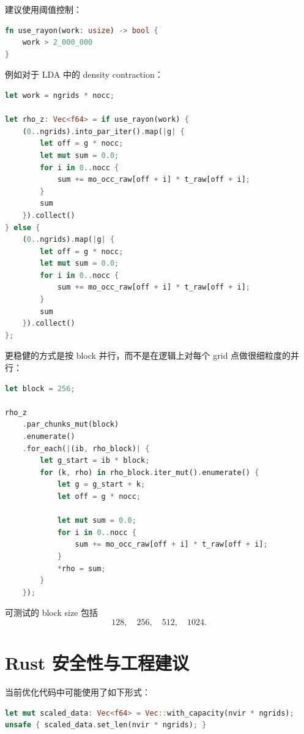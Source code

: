 \documentclass[11pt,a4paper]{ctexart}
\begin{document}
建议使用阈值控制：

\begin{lstlisting}[language=Rust,style=code]
fn use_rayon(work: usize) -> bool {
    work > 2_000_000
}
\end{lstlisting}

例如对于 LDA 中的 density contraction：

\begin{lstlisting}[language=Rust,style=code]
let work = ngrids * nocc;

let rho_z: Vec<f64> = if use_rayon(work) {
    (0..ngrids).into_par_iter().map(|g| {
        let off = g * nocc;
        let mut sum = 0.0;
        for i in 0..nocc {
            sum += mo_occ_raw[off + i] * t_raw[off + i];
        }
        sum
    }).collect()
} else {
    (0..ngrids).map(|g| {
        let off = g * nocc;
        let mut sum = 0.0;
        for i in 0..nocc {
            sum += mo_occ_raw[off + i] * t_raw[off + i];
        }
        sum
    }).collect()
};
\end{lstlisting}

更稳健的方式是按 block 并行，而不是在逻辑上对每个 grid 点做很细粒度的并行：

\begin{lstlisting}[language=Rust,style=code]
let block = 256;

rho_z
    .par_chunks_mut(block)
    .enumerate()
    .for_each(|(ib, rho_block)| {
        let g_start = ib * block;
        for (k, rho) in rho_block.iter_mut().enumerate() {
            let g = g_start + k;
            let off = g * nocc;

            let mut sum = 0.0;
            for i in 0..nocc {
                sum += mo_occ_raw[off + i] * t_raw[off + i];
            }
            *rho = sum;
        }
    });
\end{lstlisting}

可测试的 block size 包括
\begin{equation}
  128,\quad 256,\quad 512,\quad 1024.
\end{equation}

\section{Rust 安全性与工程建议}

当前优化代码中可能使用了如下形式：

\begin{lstlisting}[language=Rust,style=code]
let mut scaled_data: Vec<f64> = Vec::with_capacity(nvir * ngrids);
unsafe { scaled_data.set_len(nvir * ngrids); }
\end{lstlisting}
\end{document}
